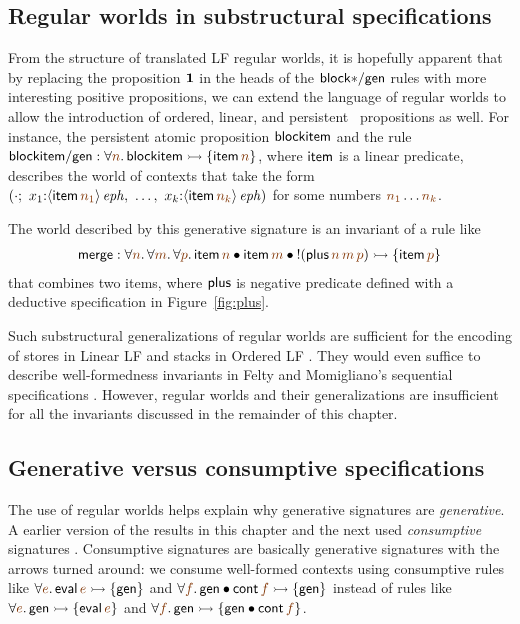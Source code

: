 \subsection{Regular worlds in substructural specifications}

From the structure of translated LF regular worlds, it is hopefully
apparent that by replacing the proposition $\mathbf{1}$ in the heads of the
${\sf block{*}/gen}$ rules with more interesting positive
\sls propositions,  we can extend the language of regular
worlds to allow the introduction of ordered, linear, and persistent
\sls~propositions as well. For instance, the persistent atomic proposition
${\sf blockitem}$ and the rule
${\sf blockitem/gen} : 
\forall \lf{n}. \, {\sf blockitem} \lefti \{ {\sf item}\,\lf{n} \}$,
where ${\sf item}$ is a linear predicate,
describes the world of contexts that take the form
$\left(\cdot; ~ x_1{:}\iseph{\susp{{\sf item}\,\lf{n_1}}}, ~
         \ldots, ~
         x_k{:}\iseph{\susp{{\sf item}\,\lf{n_k}}}\right)$
for some numbers $\lf{n_1}\ldots\lf{n_k}$. 

The world described by this generative signature is an invariant of a
rule like
\begin{align*}
  {\sf merge} : 
  \forall \lf{n}.\,\forall\lf{m}.\,\forall\lf{p}.\,
   {\sf item}\,\lf{n} \fuse
   {\sf item}\,\lf{m} \fuse
   {!}({\sf plus}\,\lf{n}\,\lf{m}\,\lf{p}) 
    \lefti \{ {\sf item}\,\lf{p} \}
\end{align*}
that combines two items,
where ${\sf plus}$ is  negative predicate defined with a deductive
specification in 
Figure~\ref{fig:plus}.  

Such substructural generalizations of regular worlds are sufficient
for the encoding of stores in Linear LF \cite{cervesato02linear} and
stacks in Ordered LF \cite{polakow01ordered}. They would even suffice
to describe well-formedness invariants in Felty and Momigliano's
sequential specifications \cite{felty12hybrid}. However, regular
worlds and their generalizations are insufficient for all the
invariants discussed in the remainder of this chapter.

\subsection{Generative versus consumptive specifications}

The use of regular worlds helps explain why generative signatures are
{\it generative}. A earlier version of the results in this chapter and
the next used {\it consumptive} signatures
\cite{simmons10type}. Consumptive signatures are basically generative
signatures with the arrows turned around: we consume well-formed
contexts using consumptive rules like $\forall\lf{e}.\,{\sf
  eval}\,\lf{e} \lefti \{ {\sf gen} \}$ and $\forall \lf{f}.\,{\sf
  gen} \fuse {\sf cont}\,\lf{f} \lefti \{ {\sf gen} \}$ instead of
rules like $\forall\lf{e}.\,{\sf gen}\lefti \{ {\sf eval}\,\lf{e} \}$
and $\forall \lf{f}.\,{\sf gen} \lefti \{ {\sf gen} \fuse {\sf
  cont}\,\lf{f} \}$. 


